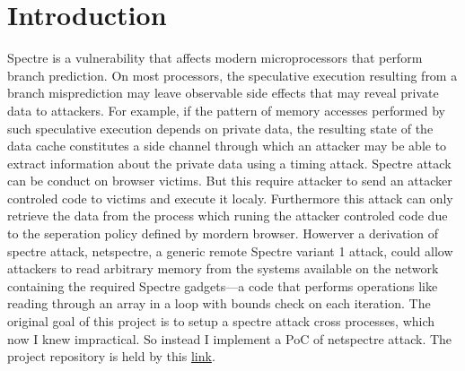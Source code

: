 \documentclass{article}
\begin{document}
\maketitle
\section{Introduction}
Spectre is a vulnerability that affects modern microprocessors that perform branch prediction. On most processors, the speculative execution resulting from a branch misprediction may leave observable side effects that may reveal private data to attackers. For example, if the pattern of memory accesses performed by such speculative execution depends on private data, the resulting state of the data cache constitutes a side channel through which an attacker may be able to extract information about the private data using a timing attack.
\newline
\newline
Spectre attack can be conduct on browser victims. But this require attacker to send an attacker controled code to victims and execute it localy. Furthermore this attack can only retrieve the data from the process which runing the attacker controled code due to the seperation policy defined by mordern browser.
\newline
\newline
Howerver a derivation of spectre attack, netspectre, a generic remote Spectre
variant 1 attack, could allow attackers to read arbitrary memory from the systems available on the network containing the required Spectre gadgets—a code that performs operations like reading through an array in a loop with bounds check on each iteration.
\newline
\newline
The original goal of this project is to setup a spectre attack cross processes, which now I knew impractical. So instead I implement a PoC of netspectre attack.
\newline
\newline
The project repository is held by this \href{https://github.com/Luna1996/WUSTL/tree/master/571/Project}{link}.
\end{document}
